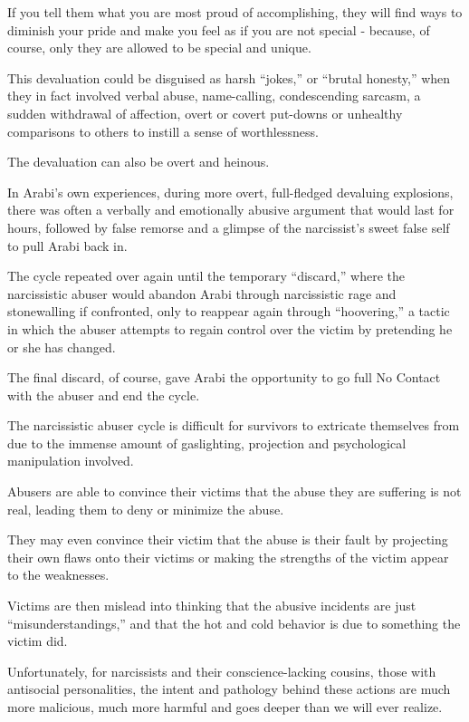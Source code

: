 \documentclass[oneside]{book}
\numberwithin{equation}{section}
\begin{document}
If you tell them what you are most proud of accomplishing, they will find ways to diminish your pride and make you feel as if you are not special - because, of course, only they are allowed to be special and unique.

%
This devaluation could be disguised as harsh ``jokes,'' or ``brutal honesty,'' when they in fact involved verbal abuse, name-calling, condescending sarcasm, a sudden withdrawal of affection, overt or covert put-downs or unhealthy comparisons to others to instill a sense of worthlessness.

The devaluation can also be overt and heinous.

In Arabi's own experiences, during more overt, full-fledged devaluing explosions, there was often a verbally and emotionally abusive argument that would last for hours, followed by false remorse and a glimpse of the narcissist's sweet false self to pull Arabi back in.

%
The cycle repeated over again until the temporary ``discard,'' where the narcissistic abuser would abandon Arabi through narcissistic rage and stonewalling if confronted, only to reappear again through ``hoovering,'' a tactic in which the abuser attempts to regain control over the victim by pretending he or she has changed.

The final discard, of course, gave Arabi the opportunity to go full No Contact with the abuser and end the cycle.

%
The narcissistic abuser cycle is difficult for survivors to extricate themselves from due to the immense amount of gaslighting, projection and psychological manipulation involved.

Abusers are able to convince their victims that the abuse they are suffering is not real, leading them to deny or minimize the abuse.

They may even convince their victim that the abuse is their fault by projecting their own flaws onto their victims or making the strengths of the victim appear to the weaknesses.

%
Victims are then mislead into thinking that the abusive incidents are just ``misunderstandings,'' and that the hot and cold behavior is due to something the victim did.

Unfortunately, for narcissists and their conscience-lacking cousins, those with antisocial personalities, the intent and pathology behind these actions are much more malicious, much more harmful and goes deeper than we will ever realize.
\end{document}
